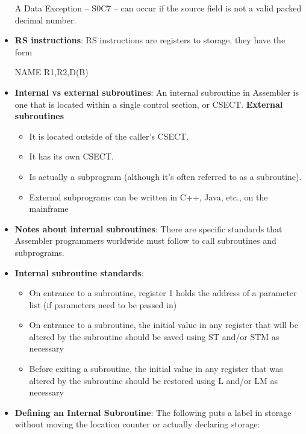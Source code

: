 \documentclass{report}
\begin{document}
\begin{itemize}
            \bigbreak \noindent 
            A Data Exception – S0C7 – can occur if the source field is not a valid packed decimal number.
        \item \textbf{RS instructions}: RS instructions are registers to storage, they have the form
            \bigbreak \noindent 
            \begin{cppcode}
            NAME   R1,R2,D(B)
            \end{cppcode}
        \item \textbf{Internal vs external subroutines}: An internal subroutine in Assembler is one that is located within a single control section, or CSECT.
            \bigbreak \noindent 
            \textbf{External subroutines}
            \begin{itemize}
                \item It is located outside of the caller's CSECT.
                \item It has its own CSECT.
                \item Is actually a subprogram (although it's often referred to as a subroutine).
                \item External subprograms can be written in C++, Java, etc., on the mainframe
            \end{itemize}
        \item \textbf{Notes about internal subroutines}: There are specific standards that Assembler programmers worldwide must follow to call subroutines and subprograms.
        \item \textbf{Internal subroutine standards}:
            \begin{itemize}
                \item On entrance to a subroutine, register 1 holds the address of a parameter list (if parameters need to be passed in)
                \item On entrance to a subroutine, the initial value in any register that will be altered by the subroutine should be saved using ST and/or STM as necessary
                \item Before exiting a subroutine, the initial value in any register that was altered by the subroutine should be restored using L and/or LM as necessary
            \end{itemize}
        \item \textbf{Defining an Internal Subroutine}: The following puts a label in storage without moving the location counter or actually declaring storage:
            \bigbreak \noindent 

\end{itemize}
\end{document}

